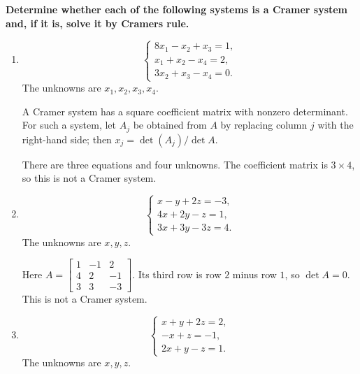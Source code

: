 \providecommand{\rank}{\operatorname{r}}
\providecommand{\RR}{\mathbb R}
\providecommand{\CC}{\mathbb C}
\providecommand{\KK}{\mathbb K}

\setcounter{enumi}{57}
\item {\bfseries\boldmath
Determine whether each of the following systems is a Cramer system and, if it is, solve it by Cramer\textquotesingle{}s rule.
}

\begin{enumerate}[label=\alph*)]

\item
\[
\begin{cases}8x_1-x_2+x_3=1,\\x_1+x_2-x_4=2,\\3x_2+x_3-x_4=0.\end{cases}
\]
The unknowns are $x_1,x_2,x_3,x_4$.

\begin{answer}
A Cramer system has a square coefficient matrix with nonzero determinant.
For such a system, let $A_j$ be obtained from $A$ by replacing column $j$
with the right-hand side; then $x_j=\det(A_j)/\det A$.

There are three equations and four unknowns. The coefficient matrix
is $3\times4$, so this is not a Cramer system.
\end{answer}

\item
\[
\begin{cases}x-y+2z=-3,\\4x+2y-z=1,\\3x+3y-3z=4.\end{cases}
\]
The unknowns are $x,y,z$.

\begin{answer}
Here
$A=\begin{bmatrix}1&-1&2\\4&2&-1\\3&3&-3\end{bmatrix}$.
Its third row is row $2$ minus row $1$, so $\det A=0$.
This is not a Cramer system.
\end{answer}

\item
\[
\begin{cases}x+y+2z=2,\\-x+z=-1,\\2x+y-z=1.\end{cases}
\]
The unknowns are $x,y,z$.


\end{enumerate}
